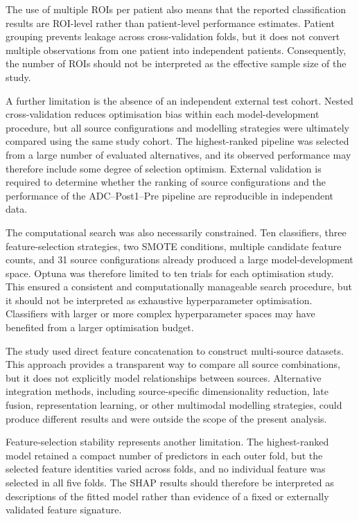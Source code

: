 \documentclass[12pt,twocolumn]{article}
\begin{document}
The use of multiple ROIs per patient also means that the reported
classification results are ROI-level rather than patient-level
performance estimates. Patient grouping prevents leakage across
cross-validation folds, but it does not convert multiple observations
from one patient into independent patients. Consequently, the number
of ROIs should not be interpreted as the effective sample size of the
study.

A further limitation is the absence of an independent external test
cohort. Nested cross-validation reduces optimisation bias within each
model-development procedure, but all source configurations and
modelling strategies were ultimately compared using the same study
cohort. The highest-ranked pipeline was selected from a large number
of evaluated alternatives, and its observed performance may therefore
include some degree of selection optimism. External validation is
required to determine whether the ranking of source configurations
and the performance of the ADC--Post1--Pre pipeline are reproducible
in independent data.

The computational search was also necessarily constrained. Ten
classifiers, three feature-selection strategies, two SMOTE
conditions, multiple candidate feature counts, and 31 source
configurations already produced a large model-development space.
Optuna was therefore limited to ten trials for each optimisation
study. This ensured a consistent and computationally manageable
search procedure, but it should not be interpreted as exhaustive
hyperparameter optimisation. Classifiers with larger or more complex
hyperparameter spaces may have benefited from a larger optimisation
budget.

The study used direct feature concatenation to construct multi-source
datasets. This approach provides a transparent way to compare all
source combinations, but it does not explicitly model relationships
between sources. Alternative integration methods, including
source-specific dimensionality reduction, late fusion, representation
learning, or other multimodal modelling strategies, could produce
different results and were outside the scope of the present analysis.

Feature-selection stability represents another limitation. The
highest-ranked model retained a compact number of predictors in each
outer fold, but the selected feature identities varied across folds,
and no individual feature was selected in all five folds. The SHAP
results should therefore be interpreted as descriptions of the fitted
model rather than evidence of a fixed or externally validated feature
signature.
\end{document}
